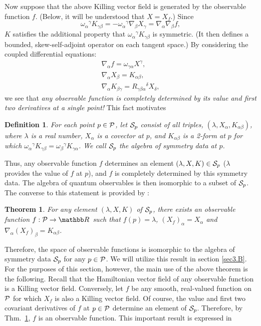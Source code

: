 \documentclass[12pt,aps,eqsecnum,tighten,nofootinbib]{revtex4-2}
\newtheorem{theorem}{Theorem}[section]
\newtheorem{definition}{Definition}[section]
\def\be{\begin{equation}}
\def\ee{\end{equation}}
\def\ba{\begin{eqnarray}}
\def\ea{\end{eqnarray}}
\def\a{\alpha}
\def\b{\beta}
\def\c{\gamma}
\def\de{\delta}
\def\grad{\nabla}
\def\P{{\cal P}}
\def\w{\omega}
\newcommand{\hvf}[1]{{X_{#1}}}
\def\R{\mathbb R}
\begin{document}
Now suppose that the above Killing vector field is generated by the
observable function $f$. (Below, it will be understood that $X =
\hvf{f}$.) Since
%
\be
\w_\a{}^\c K_{\c\b} = - \w_\a{}^\c \grad_\b X_\c
		    = \grad_\a \grad_\b f,
\ee
%
$K$ satisfies the additional property that $\w_\a{}^\c K_{\c\b}$ is
symmetric.  (It then defines a bounded, skew-self-adjoint operator on
each tangent space.)  By considering the coupled differential
equations: 
%
\ba \grad_\a f = \w_{\c\a} X^\c, \\ \grad_\a X_\b =
K_{\a\b}, \\ \grad_\a K_{\b\c} = R_{\c\b\a}{}^\de X_\de, \ea 
%
we see \cite{thesis} that {\em any observable function is completely
determined by its value and first two derivatives at a single point!}
This fact motivates
%
\begin{definition}\label{Sp}
For each point $p\in\P$, let ${\cal S}_p$ consist of all triples,
$(\lambda, X_\a, K_{\a\b})$, where $\lambda$ is a real number, $X_\a$
is a covector at $p$, and $K_{\a\b}$ is a 2-form at $p$ for which
 $\w_\a{}^\c K_{\c\b} = \w_\b{}^\c K_{\c\a}$.  We call ${\cal S}_p$
the {\em algebra of symmetry data at $p$}.
\end{definition}
%
\noindent Thus, any observable function $f$ determines an element
$(\lambda, X, K) \in {\cal S}_p$ ($\lambda$ provides the value of $f$
at $p$), and $f$ is completely determined by this symmetry data.  The
algebra of quantum observables is then isomorphic to a subset of
${\cal S}_p$.  The converse to this statement is provided by
\cite{thesis}:
%
\begin{theorem}\label{thm_data}
For any element $(\lambda, X, K)$ of ${\cal S}_p$, there exists an
observable function $f : \P \rightarrow \R$ such that
$f(p) = \lambda$,  $(\hvf{f})_\a = X_\a$
and $\grad_\a (\hvf{f})_\b = K_{\a\b}$.
\end{theorem}
%
Therefore, the space of observable functions is isomorphic to the
algebra of symmetry data ${\cal S}_p$ for any $p\in\P$.  We will
utilize this result in section \ref{sec3.B}.  For the purposes of this
section, however, the main use of the above theorem is the following.
Recall that the Hamiltonian vector field of any observable function is
a Killing vector field.  Conversely, let $f$ be any smooth,
real-valued function on $\P$ for which $\hvf{f}$ is also a Killing
vector field.  Of course, the value and first two covariant
derivatives of $f$ at $p\in\P$ determine an element of ${\cal S}_p$.
Therefore, by Thm.~\ref{thm_data}, $f$ is an observable function.
This important result is expressed in
\end{document}
